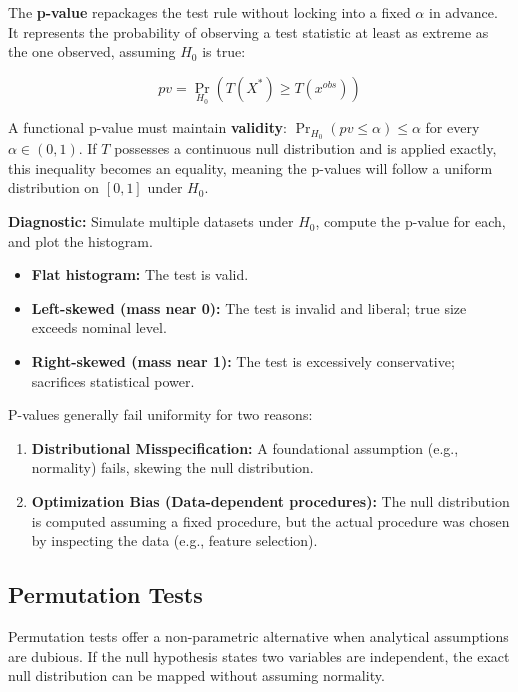 \documentclass[
  letterpaper,
  DIV=11,
  numbers=noendperiod]{scrreprt}
\providecommand{\tightlist}{%
  \setlength{\itemsep}{0pt}\setlength{\parskip}{0pt}}
\begin{document}
The \textbf{p-value} repackages the test rule without locking into a
fixed \(\alpha\) in advance. It represents the probability of observing
a test statistic at least as extreme as the one observed, assuming
\(H_0\) is true:

\[pv = \Pr_{H_0}\left(T(X^{*}) \ge T(x^{obs})\right)\]

A functional p-value must maintain \textbf{validity}:
\(\Pr_{H_0}(pv \le \alpha) \le \alpha\) for every \(\alpha \in (0, 1)\).
If \(T\) possesses a continuous null distribution and is applied
exactly, this inequality becomes an equality, meaning the p-values will
follow a uniform distribution on \([0,1]\) under \(H_0\).

\textbf{Diagnostic:} Simulate multiple datasets under \(H_0\), compute
the p-value for each, and plot the histogram.

\begin{itemize}
\tightlist
\item
  \textbf{Flat histogram:} The test is valid.
\item
  \textbf{Left-skewed (mass near 0):} The test is invalid and liberal;
  true size exceeds nominal level.
\item
  \textbf{Right-skewed (mass near 1):} The test is excessively
  conservative; sacrifices statistical power.
\end{itemize}

P-values generally fail uniformity for two reasons:

\begin{enumerate}
\def\labelenumi{\arabic{enumi}.}
\tightlist
\item
  \textbf{Distributional Misspecification:} A foundational assumption
  (e.g., normality) fails, skewing the null distribution.
\item
  \textbf{Optimization Bias (Data-dependent procedures):} The null
  distribution is computed assuming a fixed procedure, but the actual
  procedure was chosen by inspecting the data (e.g., feature selection).
\end{enumerate}

\subsection{Permutation Tests}\label{permutation-tests}

Permutation tests offer a non-parametric alternative when analytical
assumptions are dubious. If the null hypothesis states two variables are
independent, the exact null distribution can be mapped without assuming
normality.
\end{document}
